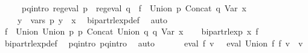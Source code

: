 \begin{isabellebody}
\ \ \ \ \ p{}{\isacharunderscore}{\kern0pt}q{}{\isacharunderscore}{\kern0pt}intro{\isacharcolon}{\kern0pt}\ {\isachardoublequoteopen}reg{\isacharunderscore}{\kern0pt}eval\ p{}\ {\isasymand}\ reg{\isacharunderscore}{\kern0pt}eval\ q{}\ {\isasymand}\ f{}{\isacharprime}{\kern0pt}\ {\isacharequal}{\kern0pt}\ Union\ p{}\ {\isacharparenleft}{\kern0pt}Concat\ q{}\ {\isacharparenleft}{\kern0pt}Var\ x{\isacharparenright}{\kern0pt}{\isacharparenright}{\kern0pt}\ {\isasymand}\isanewline
\ \ \ \ {\isacharparenleft}{\kern0pt}{\isasymforall}y\ {\isasymin}\ vars\ p{}{\isachardot}{\kern0pt}\ y\ {\isasymnoteq}\ x{\isacharparenright}{\kern0pt}{\isachardoublequoteclose}\ \isamarkupfalse%
\ bipart{\isacharunderscore}{\kern0pt}rlexp{\isacharunderscore}{\kern0pt}def\ \isamarkupfalse%
\ auto\isanewline
\ \ \isamarkupfalse%
\ {\isacharquery}{\kern0pt}f{\isacharprime}{\kern0pt}\ {\isacharequal}{\kern0pt}\ {\isachardoublequoteopen}Union\ {\isacharparenleft}{\kern0pt}Union\ p{}\ p{}{\isacharparenright}{\kern0pt}\ {\isacharparenleft}{\kern0pt}Concat\ {\isacharparenleft}{\kern0pt}Union\ q{}\ q{}{\isacharparenright}{\kern0pt}\ {\isacharparenleft}{\kern0pt}Var\ x{\isacharparenright}{\kern0pt}{\isacharparenright}{\kern0pt}{\isachardoublequoteclose}\isanewline
\ \ \isamarkupfalse%
\ {\isachardoublequoteopen}bipart{\isacharunderscore}{\kern0pt}rlexp\ x\ {\isacharquery}{\kern0pt}f{\isacharprime}{\kern0pt}{\isachardoublequoteclose}\ \isamarkupfalse%
\ bipart{\isacharunderscore}{\kern0pt}rlexp{\isacharunderscore}{\kern0pt}def\ \isamarkupfalse%
\ p{}{\isacharunderscore}{\kern0pt}q{}{\isacharunderscore}{\kern0pt}intro\ p{}{\isacharunderscore}{\kern0pt}q{}{\isacharunderscore}{\kern0pt}intro\ \isamarkupfalse%
\ auto\isanewline
\ \ \isamarkupfalse%
\ \isamarkupfalse%
\ {\isachardoublequoteopen}{\isasymPsi}\ {\isacharparenleft}{\kern0pt}eval\ {\isacharquery}{\kern0pt}f{\isacharprime}{\kern0pt}\ v{\isacharparenright}{\kern0pt}\ {\isacharequal}{\kern0pt}\ {\isasymPsi}\ {\isacharparenleft}{\kern0pt}eval\ {\isacharparenleft}{\kern0pt}Union\ f{}\ f{}{\isacharparenright}{\kern0pt}\ v{\isacharparenright}{\kern0pt}{\isachardoublequoteclose}\ \ v\isanewline
\ \ \ \ \isamarkupfalse%

\end{isabellebody}
